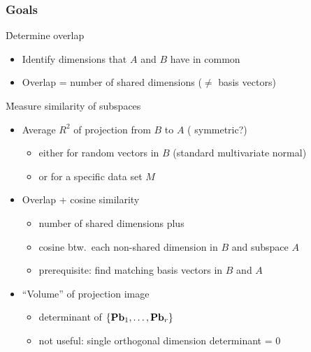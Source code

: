\documentclass[t]{beamer} %
\begin{document}
\begin{frame}
  \frametitle{Goals}

  \h{Determine overlap}
  \begin{itemize}
  \item<2-> Identify dimensions that $A$ and $B$ have in common
  \item<2-> Overlap = number of shared dimensions ($\neq$ basis vectors)
  \end{itemize}

  \h{Measure similarity of subspaces}
  \begin{itemize}
  \item<3-> Average $R^2$ of projection from $B$ to $A$ (\hand{} symmetric?)
    \begin{itemize}
    \item either for random vectors in $B$ (standard multivariate normal)
    \item or for a specific data set $M$
    \end{itemize}
  \item<4-> Overlap + cosine similarity
    \begin{itemize}
    \item number of shared dimensions plus
    \item cosine btw.\ each non-shared dimension in $B$ and subspace $A$
    \item prerequisite: find matching basis vectors in $B$ and $A$
    \end{itemize}
  \item<5-> ``Volume'' of projection image
    \begin{itemize}
    \item determinant of $\set{\mathbf{P}\vb_1, \ldots, \mathbf{P}\vb_r}$
    \item not useful: single orthogonal dimension \so{} determinant = 0
    \end{itemize}
  \end{itemize}
\end{frame}
\end{document}
